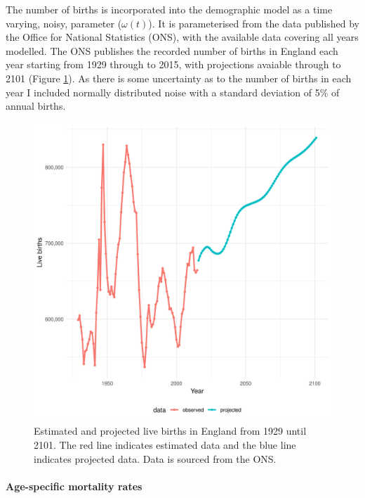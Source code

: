\documentclass[11pt,twoside]{bristolthesis}
\begin{document}
  The number of births is incorporated into the demographic model as a time varying, noisy, parameter (\(\omega(t)\)). It is parameterised from the data published by the Office for National Statistics (ONS), with the available data covering all years modelled. The ONS publishes the recorded number of births in England each year starting from 1929 through to 2015, with projections avaiable through to 2101 (Figure \ref{fig:births-england}). As there is some uncertainty as to the number of births in each year I included normally distributed noise with a standard deviation of 5\% of annual births.
  \begin{figure}
  
  {\centering \includegraphics[width=0.8\linewidth,]{chapters/model-development/resources/figure/births} 
  
  }
  
  \caption[Estimated and projected live births in England from 1929 until 2101.]{Estimated and projected live births in England from 1929 until 2101. The red line indicates estimated data and the blue line indicates projected data. Data is sourced from the ONS.}\label{fig:births-england}
  \end{figure}
  \hypertarget{age-specific-mortality-rates}{%
  \paragraph{Age-specific mortality rates}\label{age-specific-mortality-rates}}
  
\end{document}
